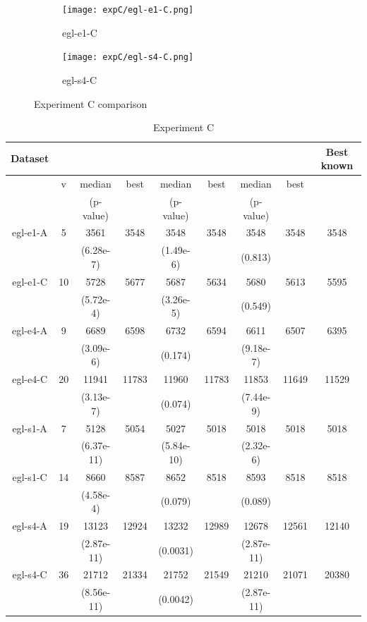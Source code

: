 \documentclass[twoside]{ctuthesis}
\theoremstyle{plain}
\theoremstyle{definition}
\theoremstyle{note}
\begin{document}
\begin{figure}[htbp]
	\label{f:fff}
	\centering
	\begin{subfigure}{0.49\textwidth}
		\centering
		\texttt{[image: expC/egl-e1-C.png]}
		\caption{egl-e1-C}
	\end{subfigure}
	\hfill
	\begin{subfigure}{0.49\textwidth}
		
		\centering
		\texttt{[image: expC/egl-s4-C.png]}
		\caption{egl-s4-C}
	\end{subfigure}
	\caption{Experiment C comparison}
\end{figure}


\begin{table}[htbp]
	\centering
	\caption{Experiment C}
	\label{tab:tablec}
	\begin{tabular}{|c|c|cc|cc|cc|c|}
		\hline
		\textbf{Dataset}&&\multicolumn{2}{c|}{\textbf{\nnsrbasic200}}&\multicolumn{2}{c|}{\textbf{\nnsrnode200}}&\multicolumn{2}{c|}{\textbf{\nnsredge}}&\textbf{Best known} \\ \hline
		&v&median&best&median&best&median&best&\\
		&&(p-value)&&(p-value)&&(p-value)&&\\
		\hline
		egl-e1-A&5&3561&3548&3548&3548&3548&3548&3548\\
		&&(6.28e-7)&& (1.49e-6)&& (0.813)&&\\ \hline
		egl-e1-C&10&5728&5677&5687&5634&5680&5613&5595\\
		&&(5.72e-4)&& (3.26e-5)&& (0.549)&&\\ \hline
		egl-e4-A&9&6689&6598&6732&6594&6611&6507&6395\\
		&&(3.09e-6)&& (0.174)&& (9.18e-7)&&\\ \hline
		egl-e4-C&20&11941&11783&11960&11783&11853&11649&11529\\
		&&(3.13e-7)&& (0.074)&& (7.44e-9)&&\\ \hline
		egl-s1-A&7&5128&5054&5027&5018&5018&5018&5018\\
		&&(6.37e-11)&& (5.84e-10)&& (2.32e-6)&&\\ \hline
		egl-s1-C&14&8660&8587&8652&8518&8593&8518&8518\\
		&&(4.58e-4)&& (0.079)&& (0.089)&&\\ \hline
		egl-s4-A&19&13123&12924&13232&12989&12678&12561&12140\\
		&&(2.87e-11)&& (0.0031)&& (2.87e-11)&&\\ \hline
		egl-s4-C&36&21712&21334&21752&21549&21210&21071&20380\\
		&&(8.56e-11)&& (0.0042)&& (2.87e-11)&&\\ \hline
	\end{tabular}
\end{table}
\end{document}
